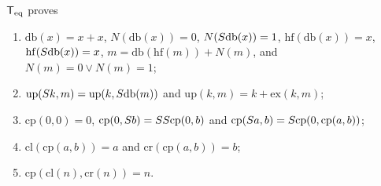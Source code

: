 \begin{lemma}
\label{base:lem:cp}
$\mathsf{T}_{\mathrm{eq}}$ proves
\begin{enumerate}[label=\textup{(\roman*)}]
\item $\mathrm{db}(x)=x+x$, $N(\mathrm{db}(x))=0$,
 $N(S\mathrm{db}(x))=1$, $\mathrm{hf}(\mathrm{db}(x))=x$,
 $\mathrm{hf}(S\mathrm{db}(x))=x$, $m=\mathrm{db}(\mathrm{hf}(m))+N(m)$,
 and $N(m)=0\vee N(m)=1$;
\item $\mathrm{up}(S k,m)=\mathrm{up}(k,S\mathrm{db}(m))$ and
 $\mathrm{up}(k,m)=k+\mathrm{ex}(k,m)$;
\item $\mathrm{cp}(0,0)=0$, $\mathrm{cp}(0,S b)=SS\mathrm{cp}(0,b)$
 and $\mathrm{cp}(S a,b)=S\mathrm{cp}(0,\mathrm{cp}(a,b))$;
\item $\mathrm{cl}(\mathrm{cp}(a,b))=a$ and $\mathrm{cr}(\mathrm{cp}(a,b))=b$;
\item $\mathrm{cp}(\mathrm{cl}(n),\mathrm{cr}(n))=n$.
\end{enumerate}
\end{lemma}

